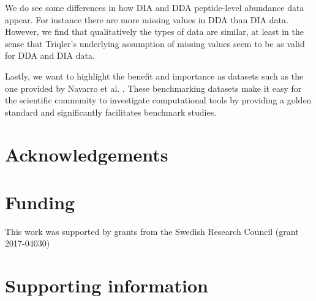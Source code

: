 \documentclass[10pt,letterpaper]{article}
\begin{document}
We do see some differences in how DIA and DDA peptide-level abundance data appear. For instance there are more missing values in DDA than DIA data. However, we find that qualitatively the types of data are similar, at least in the sense that Triqler's underlying assumption of missing values seem to be as valid for DDA and DIA data.

Lastly, we want to highlight the benefit and importance as datasets such as the one provided by Navarro et al. \cite{navarro2016multicenter}. These benchmarking datasets make it easy for the scientific community to investigate computational tools by providing a golden standard and significantly facilitates benchmark studies. 

\section*{Acknowledgements}


\section*{Funding}

This work was supported by grants from the Swedish Research Council (grant 2017-04030) 

\section*{Supporting information}


%

\end{document}
